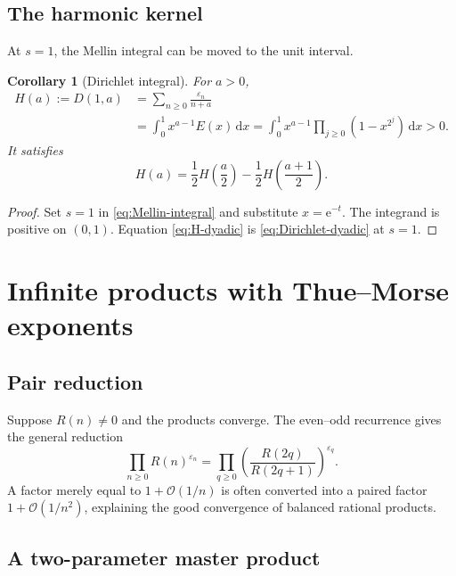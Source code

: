 \documentclass[11pt,oneside]{article}
\numberwithin{equation}{section}
\newtheorem{corollary}[theorem]{Corollary}
\theoremstyle{definition}
\theoremstyle{remark}
\newcommand{\e}{\mathrm e}
\newcommand{\dd}{\,\mathrm d}
\newcommand{\bigO}{\mathcal O}
\newcommand{\eps}{\varepsilon}
\begin{document}
\subsection{The harmonic kernel}

At \(s=1\), the Mellin integral can be moved to the unit interval.

\begin{corollary}[Dirichlet integral]
\label{cor:harmonic-integral}
For \(a>0\),
\begin{align}
  H(a):=D(1,a)
  &=\sum_{n\ge0}\frac{\eps_n}{n+a}
  \label{eq:H-definition}\\
  &=\boxed{
  \int_0^1x^{a-1}E(x)\dd x
  =\int_0^1x^{a-1}
    \prod_{j\ge0}(1-x^{2^j})\dd x}>0.
  \label{eq:H-integral}
\end{align}
It satisfies
\begin{equation}
  \boxed{
  H(a)=\frac12H\!\left(\frac a2\right)
       -\frac12H\!\left(\frac{a+1}{2}\right).}
  \label{eq:H-dyadic}
\end{equation}
\end{corollary}

\begin{proof}
Set \(s=1\) in \eqref{eq:Mellin-integral} and substitute \(x=\e^{-t}\).
The integrand is positive on \((0,1)\).  Equation \eqref{eq:H-dyadic} is
\eqref{eq:Dirichlet-dyadic} at \(s=1\).
\end{proof}

\section[Thue--Morse exponent products]{Infinite products with Thue--Morse exponents}
\label{sec:exponent-products}

\subsection{Pair reduction}

Suppose \(R(n)\ne0\) and the products converge.  The even--odd recurrence
gives the general reduction
\begin{equation}
  \boxed{
  \prod_{n\ge0}R(n)^{\eps_n}
  =\prod_{q\ge0}
    \left(\frac{R(2q)}{R(2q+1)}\right)^{\eps_q}.}
  \label{eq:pair-reduction}
\end{equation}
A factor merely equal to \(1+\bigO(1/n)\) is often converted into a paired
factor \(1+\bigO(1/n^2)\), explaining the good convergence of balanced
rational products.

\subsection{A two-parameter master product}
\end{document}
